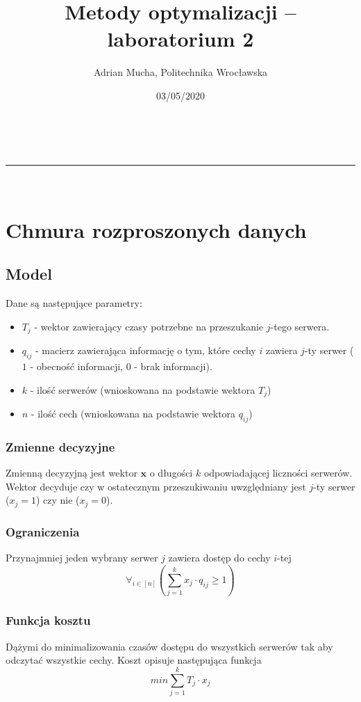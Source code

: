 \documentclass[a4paper,11pt]{article}
\makeatletter
\newcommand{\linia}{\rule{\linewidth}{0.5pt}}
\theoremstyle{mytheor}
\renewcommand{\maketitle}{
\begin{center}
\vspace{2ex}
{\huge \textsc{\@title}}
\vspace{1ex}
\\
\linia\\
\@author \hfill \@date
\vspace{4ex}
\end{center}
}
\makeatother
\begin{document}
\title{Metody optymalizacji – laboratorium 2}

\author{Adrian Mucha, Politechnika Wrocławska}

\date{03/05/2020}

\maketitle

\section{Chmura rozproszonych danych}

\subsection{Model}
Dane są następujące parametry:
\begin{itemize}
    \item $T_j$ - wektor zawierający czasy potrzebne na przeszukanie $j$-tego serwera.
    \item $q_{ij}$ - macierz zawierająca informację o tym, które cechy $i$ zawiera $j$-ty serwer ($1$ - obecność informacji, $0$ - brak informacji).
    \item $k$ - ilość serwerów (wnioskowana na podstawie wektora $T_j$)
    \item $n$ - ilość cech (wnioskowana na podstawie wektora $q_{ij}$)
\end{itemize}

\subsubsection{Zmienne decyzyjne}
Zmienną decyzyjną jest wektor $\mathbf{x}$ o długości $k$ odpowiadającej liczności serwerów. Wektor decyduje czy w ostatecznym przeszukiwaniu uwzględniany jest $j$-ty serwer ($x_j = 1$) czy nie ($x_j = 0$).

\subsubsection{Ograniczenia}
Przynajmniej jeden wybrany serwer $j$ zawiera dostęp do cechy $i$-tej
$$ \forall_{i\in[n]} (\sum_{j=1}^{k} x_j \cdot q_{ij} \geq 1) $$

\subsubsection{Funkcja kosztu}
Dążymi do minimalizowania czasów dostępu do wszystkich serwerów tak aby odczytać wszystkie cechy. Koszt opisuje następująca funkcja
$$ \textit{min}\sum_{j=1}^{k} T_j \cdot x_j $$
\end{document}
